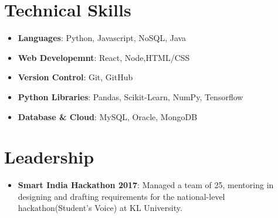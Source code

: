 \documentclass[letterpaper,11pt]{article}
\newcommand{\resumeItem}[2]{
  \item\small{
    \textbf{#1}{: #2 \vspace{-2pt}}
  }
}
\newcommand{\resumeSubItem}[2]{\resumeItem{#1}{#2}\vspace{-4pt}}
\newcommand{\resumeSubHeadingListStart}{\begin{itemize}[leftmargin=*]}
\newcommand{\resumeSubHeadingListEnd}{\end{itemize}}
\begin{document}
%
\section{Technical Skills}
 \resumeSubHeadingListStart
     \resumeSubItem{\textbf{Languages}}{Python, Javascript, NoSQL, Java}\\
     \resumeSubItem{\textbf{Web Developemnt}}{React, Node,HTML/CSS}\\
     \resumeSubItem{\textbf{Version Control}}{Git, GitHub}\\
     \resumeSubItem{\textbf{Python Libraries}}{Pandas, Scikit-Learn, NumPy, Tensorflow}\\
     \resumeSubItem{\textbf{Database \& Cloud}}{MySQL, Oracle, MongoDB}
  \resumeSubHeadingListEnd
\section{Leadership}
\resumeSubHeadingListStart
\resumeSubItem{Smart India Hackathon 2017}
      {Managed a team of 25, mentoring in designing and drafting requirements for the national-level hackathon(Student's Voice) at KL University.}

 \resumeSubHeadingListEnd
 
\end{document}
